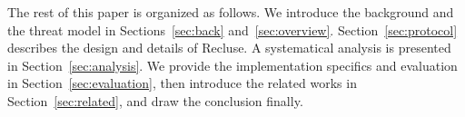 The rest of this paper is organized as follows. We introduce the background and the threat model in Sections~\ref{sec:back} and~\ref{sec:overview}. Section~\ref{sec:protocol} describes the design  and details of Recluse. A systematical analysis is presented in Section~\ref{sec:analysis}. We provide the implementation specifics and evaluation in Section~\ref{sec:evaluation}, then introduce the related works in Section~\ref{sec:related}, and draw the conclusion finally.




